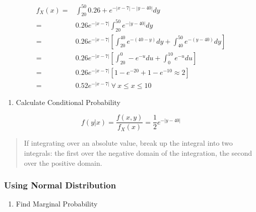 \documentclass[11pt]{article}
\begin{document}
\begin{equation}
\begin{split}
f_X(x) = & \int_{20}^{50} 0.26 + e^{- |x - 7| - |y - 40|} dy\\
    = & 0.26 e ^{-|x - 7|} \int_{20}^{50} e^{- |y - 40|} dy\\
    = & 0.26 e ^{-|x - 7|} [\int_{20}^{40} e^{- (40 - y)} dy +  \int_{40}^{50} e^{- (y - 40)} dy]\\
    = & 0.26 e ^{-|x - 7|} [\int_{20}^{0} - e^{-u} du +  \int_{0}^{10} e^{- u} du]\\
    = & 0.26 e ^{-|x - 7|} [1 - e^{-20} + 1 - e^{-10} \approx 2 ] \\
    = & 0.52 e ^{- |x - 7|} \ \forall \ x \leq x \leq 10
\end{split}
\end{equation}

\begin{enumerate}
\item Calculate Conditional Probability
\end{enumerate}

$$
f(y | x) = \frac{f(x, y)}{f_X (x)} = \frac{1}{2} e^{- |y - 40|}
$$

\begin{quote}
If integrating over an absolute value, break up the integral into two integrals:
the first over the negative domain of the integration, the second over the
positive domain.
\end{quote}

\subsubsection{Using Normal Distribution}
\label{sec:org1a7d627}

\begin{enumerate}
\item Find Marginal Probability
\end{enumerate}
\end{document}
